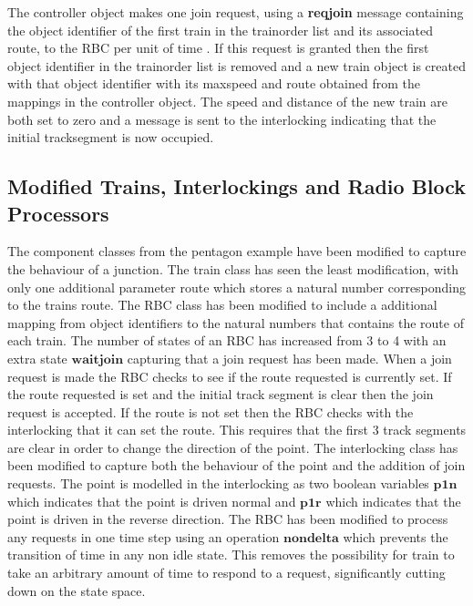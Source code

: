 The controller object makes one join request, using a \textbf{reqjoin} message containing the object identifier of the first train in the trainorder list and its associated route, to the RBC per unit of time . If this request is granted then the first object identifier in the trainorder list is removed and a new train object is created with that object identifier with its maxspeed and route obtained from the mappings in the controller object. The speed and distance of the new train are both set to zero and a message is sent to the interlocking indicating that the initial tracksegment is now occupied. 

\subsection*{Modified Trains, Interlockings and Radio Block Processors}
The component classes from the pentagon example have been modified to capture the behaviour of a junction.  The train class has seen the least modification, with only one additional parameter route which stores a natural number corresponding to the trains route. The RBC class has been modified to include a additional mapping from object identifiers to the natural numbers that contains the route of each train. The number of states of an RBC has increased from 3 to 4 with an extra state $\mathbf{waitjoin}$ capturing that a join request has been made. When a join request is made the RBC checks to see if the route requested is currently set. If the route requested is set and the initial track segment is clear then the join request is accepted. If the route is not set then the RBC checks with the interlocking that it can set the route. This requires that the first 3 track segments are clear in order to change the direction of the point. The interlocking class has been modified to capture both the behaviour of the point and the addition of join requests. The point is modelled in the interlocking as two boolean variables $\mathbf{p1n}$ which indicates that the point is driven normal and $\mathbf{p1r}$ which indicates that the point is driven in the reverse direction.
%
The RBC has been modified to process any requests in one time step using an operation $\mathbf{nondelta}$ which prevents the transition of time in any non idle state. This removes the possibility for train to take an arbitrary amount of time to respond to a request, significantly cutting down on the state space.












